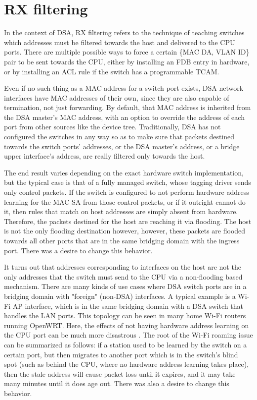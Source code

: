 \documentclass[letterpaper]{article}
\begin{document}
\section{RX filtering}

In the context of DSA, RX filtering refers to the technique of teaching
switches which addresses must be filtered towards the host and delivered to the
CPU ports. There are multiple possible ways to force a certain \{MAC DA, VLAN
ID\} pair to be sent towards the CPU, either by installing an FDB entry in
hardware, or by installing an ACL rule if the switch has a programmable TCAM.

Even if no such thing as a MAC address for a switch port exists, DSA network
interfaces have MAC addresses of their own, since they are also capable of
termination, not just forwarding. By default, that MAC address is inherited
from the DSA master's MAC address, with an option to override the address of
each port from other sources like the device tree. Traditionally, DSA has not
configured the switches in any way so as to make sure that packets destined
towards the switch ports' addresses, or the DSA master's address, or a bridge
upper interface's address, are really filtered only towards the host.

The end result varies depending on the exact hardware switch implementation,
but the typical case is that of a fully managed switch, whose tagging driver
sends only control packets. If the switch is configured to not perform hardware
address learning for the MAC SA from those control packets, or if it outright
cannot do it, then rules that match on host addresses are simply absent from
hardware. Therefore, the packets destined for the host are reaching it via
flooding. The host is not the only flooding destination however, however, these
packets are flooded towards all other ports that are in the same bridging
domain with the ingress port. There was a desire to change this behavior.

It turns out that addresses corresponding to interfaces on the host are not the
only addresses that the switch must send to the CPU via a non-flooding based
mechanism. There are many kinds of use cases where DSA switch ports are in a
bridging domain with "foreign" (non-DSA) interfaces. A typical example is a
Wi-Fi AP interface, which is in the same bridging domain with a DSA switch that
handles the LAN ports. This topology can be seen in many home Wi-Fi routers
running OpenWRT. Here, the effects of not having hardware address learning on
the CPU port can be much more disastrous \cite{switchdev-fdb-on-foreign-interfaces}.
The root of the Wi-Fi roaming issue can be summarized as follows: if a station
used to be learned by the switch on a certain port, but then migrates to
another port which is in the switch's blind spot (such as behind the CPU, where
no hardware address learning takes place), then the stale address will cause
packet loss until it expires, and it may take many minutes until it does age
out. There was also a desire to change this behavior.
\end{document}

